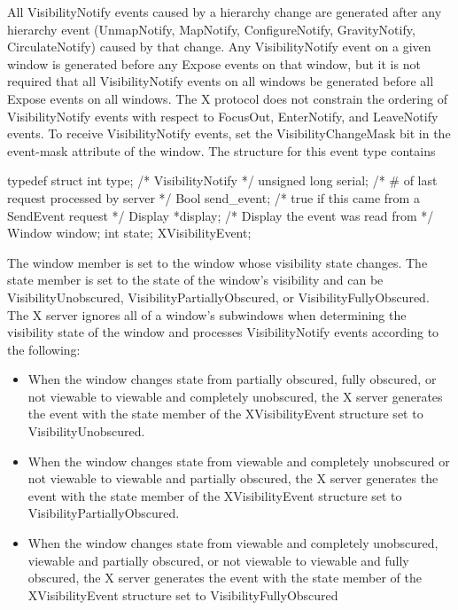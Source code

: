 \documentclass{report}
\begin{document}
\begin{itemize}
            \bigbreak \noindent 
            All VisibilityNotify events caused by a hierarchy change are generated after any hierarchy event (UnmapNotify, MapNotify, ConfigureNotify, GravityNotify, CirculateNotify) caused by that change. Any VisibilityNotify event on a given window is generated before any Expose events on that window, but it is not required that all VisibilityNotify events on all windows be generated before all Expose events on all windows. The X protocol does not constrain the ordering of VisibilityNotify events with respect to FocusOut, EnterNotify, and LeaveNotify events.
            \bigbreak \noindent 
            To receive VisibilityNotify events, set the VisibilityChangeMask bit in the event-mask attribute of the window.
            \bigbreak \noindent 
            The structure for this event type contains
            \bigbreak \noindent 
            \begin{cppcode}
                typedef struct {
                    int type;               /* VisibilityNotify */
                    unsigned long serial;   /* # of last request processed by server */
                    Bool send_event;        /* true if this came from a SendEvent request */
                    Display *display;       /* Display the event was read from */
                    Window window;
                    int state;
                } XVisibilityEvent;
            \end{cppcode}
            \bigbreak \noindent 
            The window member is set to the window whose visibility state changes. The state member is set to the state of the window’s visibility and can be VisibilityUnobscured, VisibilityPartiallyObscured, or VisibilityFullyObscured. The X server ignores all of a window’s subwindows when determining the visibility state of the window and processes VisibilityNotify events according to the following:
            \begin{itemize}
                \item When the window changes state from partially obscured, fully obscured, or not viewable to viewable and completely unobscured, the X server generates the event with the state member of the XVisibilityEvent structure set to VisibilityUnobscured.
                \item When the window changes state from viewable and completely unobscured or not viewable to viewable and partially obscured, the X server generates the event with the state member of the XVisibilityEvent structure set to VisibilityPartiallyObscured.
                \item When the window changes state from viewable and completely unobscured, viewable and partially obscured, or not viewable to viewable and fully obscured, the X server generates the event with the state member of the XVisibilityEvent structure set to VisibilityFullyObscured

\end{itemize}
\end{itemize}
\end{document}
